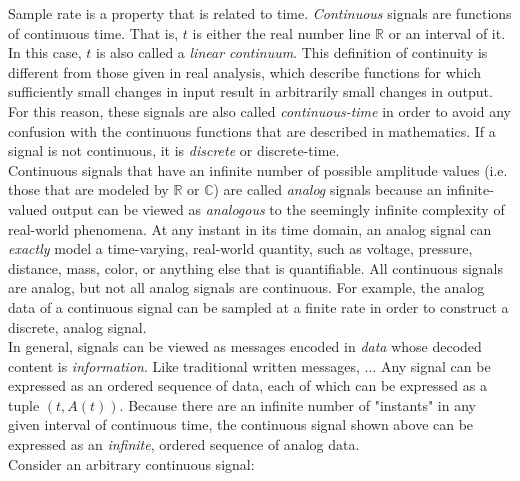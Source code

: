 Sample rate is a property that is related to time. \textit{Continuous} signals are functions of continuous time. That is, $t$ is either the real number line $\mathbb{R}$ or an interval of it. In this case, $t$ is also called a \textit{linear continuum}. This definition of continuity is different from those given in real analysis, which describe functions for which sufficiently small changes in input result in arbitrarily small changes in output. For this reason, these signals are also called \textit{continuous-time} in order to avoid any confusion with the continuous functions that are described in mathematics. If a signal is not continuous, it is \textit{discrete} or discrete-time. \\

Continuous signals that have an infinite number of possible amplitude values (i.e. those that are modeled by $\mathbb{R}$ or $\mathbb{C}$) are called \textit{analog} signals because an infinite-valued output can be viewed as \textit{analogous} to the seemingly infinite complexity of real-world phenomena. At any instant in its time domain, an analog signal can \textit{exactly} model a time-varying, real-world quantity, such as voltage, pressure, distance, mass, color, or anything else that is quantifiable. All continuous signals are analog, but not all analog signals are continuous. For example, the analog data of a continuous signal can be sampled at a finite rate in order to construct a discrete, analog signal. \\


In general, signals can be viewed as messages encoded in \textit{data} whose decoded content is \textit{information}. Like traditional written messages, ... Any signal can be expressed as an ordered sequence of data, each of which can be expressed as a tuple $(t,A(t))$. Because there are an infinite number of "instants" in any given interval of continuous time, the continuous signal shown above can be expressed as an \textit{infinite}, ordered sequence of analog data. \\


Consider an arbitrary continuous signal:


